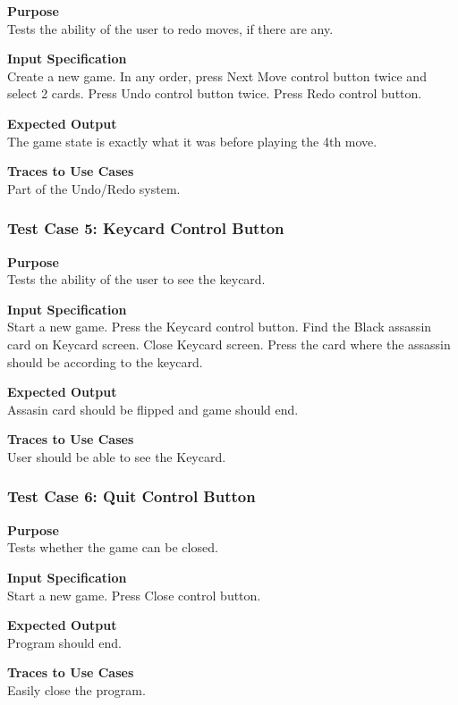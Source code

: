 \documentclass[12pt]{article}
\begin{document}
\noindent
{\bf Purpose}\\
Tests the ability of the user to redo moves, if there are any.

\noindent
{\bf Input Specification}\\
Create a new game. In any order, press Next Move control button twice and select 2 cards. Press Undo control button twice. Press Redo control button.

\noindent
{\bf Expected Output}\\
The game state is exactly what it was before playing the 4th move.

\noindent
{\bf Traces to Use Cases}\\
Part of the Undo/Redo system.

\subsubsection{Test Case 5: Keycard Control Button} \label{tc:5}

\noindent
{\bf Purpose}\\
Tests the ability of the user to see the keycard.

\noindent
{\bf Input Specification}\\
Start a new game. Press the Keycard control button. Find the Black assassin card on Keycard screen. Close Keycard screen. Press the card where the assassin should be according to the keycard.

\noindent
{\bf Expected Output}\\
Assasin card should be flipped and game should end.

\noindent
{\bf Traces to Use Cases}\\
User should be able to see the Keycard.

\subsubsection{Test Case 6: Quit Control Button} \label{tc:6}

\noindent
{\bf Purpose}\\
Tests whether the game can be closed.

\noindent
{\bf Input Specification}\\
Start a new game. Press Close control button.

\noindent
{\bf Expected Output}\\
Program should end.

\noindent
{\bf Traces to Use Cases}\\
Easily close the program.
\end{document}
